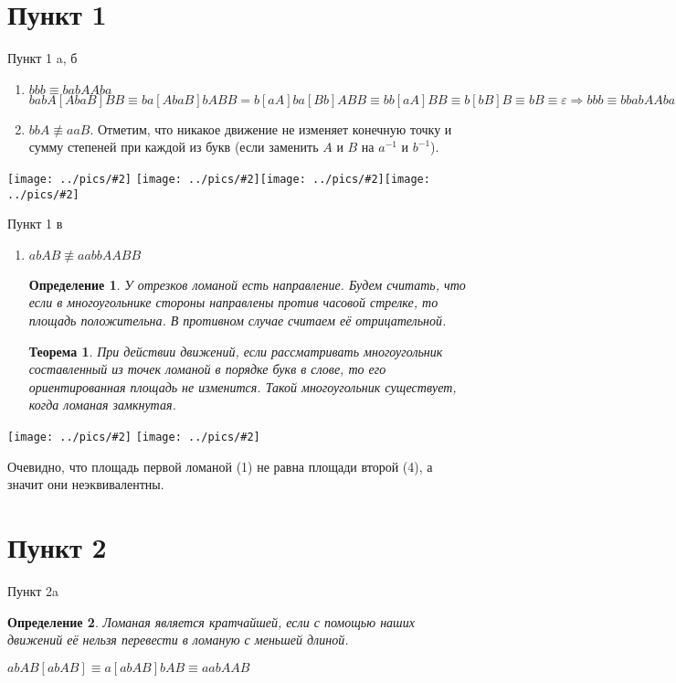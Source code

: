 \documentclass[serif, ucs]{beamer}
\newtheorem{Def}{Определение}[section]
\newtheorem{Th}{Теорема}[section]
\newcommand{\gr}[2]{\texttt{[image: ../pics/\#2]}}
\begin{document}
\section{Пункт 1}
\begin{frame}{Пункт 1 a, б}
	\begin{footnotesize}
	\begin{enumerate}
		\item $bbb \equiv babAAba\qquad$ $babA[AbaB]BB\equiv
ba[AbaB]bABB = b[aA]ba[Bb]ABB \equiv
bb[aA]BB \equiv b[bB]B \equiv bB \equiv \varepsilon \Rightarrow bbb \equiv
bbabAAba$
		\item $bbA\not\equiv aaB$. Отметим, что никакое движение не изменяет конечную точку и сумму степеней при каждой из букв (если заменить $A$ и $B$ на $a^{-1}$ и $b^{-1}$).
	\end{enumerate}
	\end{footnotesize}
	
	\gr{0.2}{bbb} \gr{0.2}{babAAba}\gr{0.2}{bbA}\gr{0.2}{aaB}
\end{frame}

\begin{frame}{Пункт 1 в}
	\begin{enumerate}
		\item []$abAB\not\equiv aabbAABB$
		\begin{Def}
			У отрезков ломаной есть направление. Будем считать, что если в многоугольнике стороны направлены против часовой стрелке, то площадь положительна. В противном случае считаем её отрицательной.
		\end{Def}
		\begin{Th}
		При действии движений, если рассматривать многоугольник составленный из точек ломаной в порядке букв в слове, то его ориентированная площадь не изменится. Такой многоугольник существует, когда ломаная замкнутая.
		\end{Th}
	\end{enumerate}
\end{frame}

\begin{frame}
	\gr{0.4}{abAB} \gr{0.4}{aabbAABB}
	
	Очевидно, что площадь первой ломаной (1) не равна площади второй (4), а значит они неэквивалентны.
\end{frame}

\section{Пункт 2}
\begin{frame}{Пункт 2a}
	\begin{Def}
		Ломаная является кратчайшей, если с помощью наших движений её нельзя перевести в ломаную с меньшей длиной.
	\end{Def}	
	$abAB[abAB] \equiv a[abAB]bAB\equiv aabAAB$
	
\end{frame}
\end{document}
